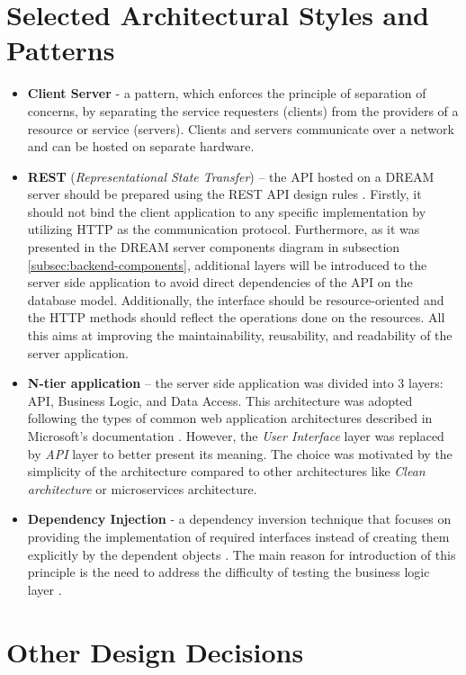\section{Selected Architectural Styles and Patterns}\label{sec:patterns}
\begin{itemize}
    \item \textbf{Client Server} - a pattern, which enforces the principle of separation of concerns, by separating the service requesters (clients) from the providers of a resource or service (servers). Clients and servers communicate over a network and can be hosted on separate hardware.
    \item \textbf{REST} (\textit{Representational State Transfer}) – the API hosted on a DREAM server should be prepared using the REST API design rules \cite{rest} \cite{rest-microsoft}. Firstly, it should not bind the client application to any specific implementation by utilizing HTTP as the communication protocol. Furthermore, as it was presented in the DREAM server components diagram in subsection \ref{subsec:backend-components}, additional layers will be introduced to the server side application to avoid direct dependencies of the API on the database model. Additionally, the interface should be resource-oriented and the HTTP methods \cite{rfc1945} should reflect the operations done on the resources. All this aims at improving the maintainability, reusability, and readability of the server application.
    \item \textbf{N-tier application} – the server side application was divided into 3 layers: API, Business Logic, and Data Access. This architecture was adopted following the types of common web application architectures described in Microsoft's documentation \cite{ntier}. However, the \textit{User Interface} layer was replaced by \textit{API} layer to better present its meaning. The choice was motivated by the simplicity of the architecture compared to other architectures like \textit{Clean architecture} or microservices architecture. 
    \item \textbf{Dependency Injection} - a dependency inversion technique that focuses on providing the implementation of required interfaces instead of creating them explicitly by the dependent objects \cite{di}. The main reason for introduction of this principle is the need to address the difficulty of testing the business logic layer \cites{ntier}. 
\end{itemize}

\section{Other Design Decisions}

